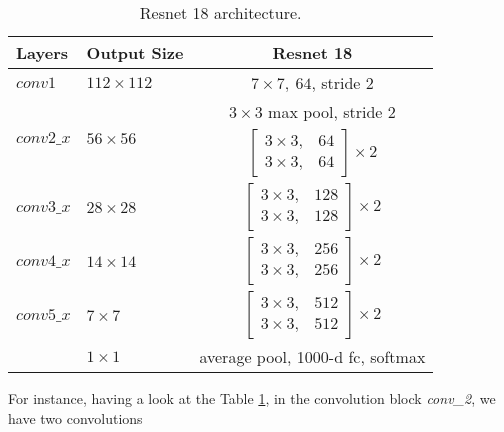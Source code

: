 \begin{table}[H]
    \label{arch:resnet:18}
    \centering
    \begin{tabular}{llc}
    Layers                      & Output Size                     & Resnet 18                                                                     \\ \hline
    $conv1$                     & $112\times112$                  & $7 \times 7, \ 64$, stride 2                                                  \\
    \multirow{2}{*}{$conv2\_x$} & \multirow{2}{*}{$56 \times 56$} & $3 \times 3$ max pool, stride 2                                               \\
                                &                                 & $\begin{bmatrix}3 \times 3 , & 64 \\ 3 \times 3,& 64 \end{bmatrix} \times 2$  \\
    $conv3\_x$                  & $28 \times 28$                  & $\begin{bmatrix} 3\times 3, & 128 \\ 3\times 3, & 128 \end{bmatrix} \times 2$ \\
    $conv4\_x$                  & $14 \times 14$                  & $\begin{bmatrix} 3\times 3, & 256\\ 3\times 3, & 256\end{bmatrix} \times 2$   \\
    $conv5\_x$                  & $7 \times 7$                    & $\begin{bmatrix} 3\times 3, & 512\\ 3\times 3, & 512\end{bmatrix} \times 2$   \\
                                & $1\times 1 $                    & average pool, 1000-d fc, softmax                                             
    \end{tabular}
    \caption{Resnet 18 architecture.}
    \end{table}

For instance, having a look at the Table \ref{arch:resnet:18}, in the convolution block \emph{conv\_2}, we have two convolutions 